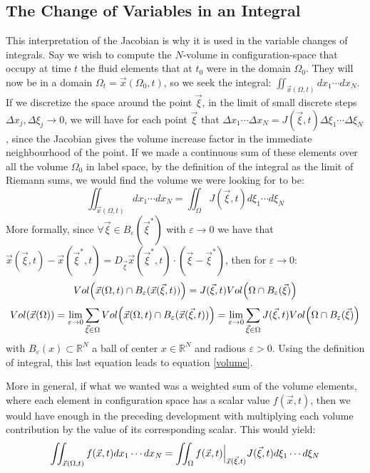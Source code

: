 \documentclass[11pt, a4paper]{article} %
\newcommand{\R}{\mathbb{R}} %
\begin{document}
\subsection*{ The Change of Variables in an Integral\vspace{-0.2cm}}
This interpretation of the Jacobian is why it is used in the variable changes of integrals. Say we wish to compute the $N$-volume in configuration-space that occupy at time $t$ the fluid elements that at $t_0$ were in the domain $\Omega_0$. They will now be in a domain $\Omega_t=\vec{x}(\Omega_0,t)$, so we seek the integral: $\iint_{\vec{x}(\Omega,t)}dx_1\cdots dx_N$. If we discretize the space around the point $\vec{\xi}$, in the limit of small discrete steps $\Delta x_j, \Delta \xi_j \rightarrow 0$, we will have for each point $\vec{\xi}$ that $\Delta x_1\cdots \Delta x_N= J(\vec{\xi},t)\Delta \xi_1\cdots \Delta\xi_N$, since the Jacobian gives the volume increase factor in the immediate neighbourhood of the point. If we made a continuous sum of these elements over all the volume $\Omega_0$ in label space, by the definition of the integral as the limit of Riemann sums, we would find the volume we were looking for to be:
\begin{equation}\label{volume}
\iint_{\vec{x}(\Omega,t)}dx_1\cdots dx_N=\iint_{\Omega} J(\vec{\xi},t) d\xi_1\cdots d\xi_N
\end{equation}
More formally, since $\forall \vec{\xi}\in B_\varepsilon(\vec{\xi}^*)$ with $\varepsilon\rightarrow 0$ we have that $\vec{x}(\vec{\xi},t)-\vec{x}(\vec{\xi}^*,t)= D_{\vec{\xi}}\vec{x}(\vec{\xi}^*,t)\cdot (\vec{\xi}-\vec{\xi}^*)$, then for $\varepsilon \rightarrow 0$:
\begin{equation}
Vol\qty(\vec{x}(\Omega,t)\cap B_\varepsilon(\vec{x}(\vec{\xi},t)))=J(\vec{\xi},t)Vol\qty(\Omega \cap B_\varepsilon (\vec{\xi}))
\end{equation}
\begin{equation}
Vol\qty(\vec{x}(\Omega))=\lim_{ \varepsilon\rightarrow 0} \sum_{\vec{\xi}\in\Omega} Vol\qty(\vec{x}(\Omega,t)\cap B_\varepsilon(\vec{x}(\vec{\xi},t)))=\lim_{ \varepsilon\rightarrow 0} \sum_{\vec{\xi}\in\Omega} J(\vec{\xi},t)Vol\qty(\Omega \cap B_\varepsilon (\vec{\xi}))
\end{equation}
with $B_\varepsilon(x)\subset \R^N$ a ball of center $x\in\R^N$ and radious $\varepsilon>0$. Using the definition of integral, this last equation leads to equation \eqref{volume}.

More in general, if what we wanted was a weighted sum of the volume elements, where each element in configuration space has a scalar value $f(\vec{x},t)$, then we would have enough in the preceding development with multiplying each volume contribution by the value of its corresponding scalar. This would yield:
\begin{equation}\label{integralChange}
\iint_{\vec{x}(\Omega,t)}f(\vec{x},t)dx_1\cdots dx_N=\iint_{\Omega} f(\vec{x},t)\Big\rvert_{\vec{x}(\vec{\xi},t)}J(\vec{\xi},t) d\xi_1\cdots d\xi_N \vspace{-0.2cm}
\end{equation}
\end{document}
